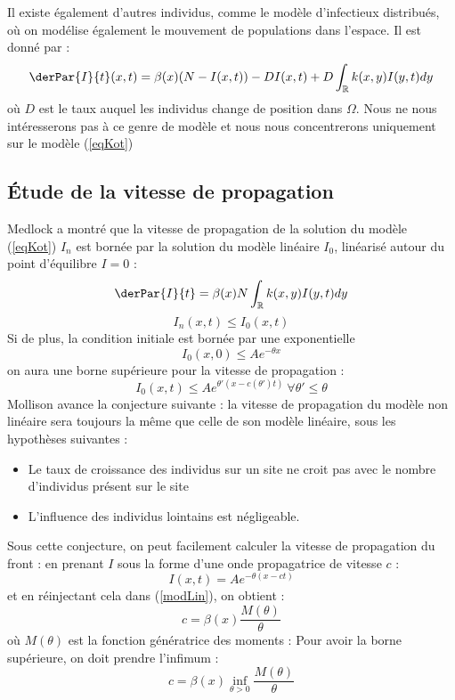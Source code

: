 \documentclass{article}
\begin{document}
\bigskip
Il existe également d'autres individus, comme le modèle d'infectieux distribués, où on modélise également le mouvement de populations dans l'espace. Il est donné par :
\begin{equation}
	\derPar{I}{t}(x,t)=\beta(x)(N-I(x,t))-DI(x,t)+D\int_{\mathbb{R}}k(x,y)I(y,t) dy
\end{equation}
où $D$ est le taux auquel les individus change de position dans $\Omega$. Nous ne nous intéresserons pas à ce genre de modèle et nous nous concentrerons uniquement sur le modèle (\ref{eqKot})

\subsection{Étude de la vitesse de propagation}
\label{refVit}
Medlock \cite{KotMedlock03} a montré que la vitesse de propagation de la solution du modèle (\ref{eqKot}) $I_n$ est bornée par la solution du modèle linéaire $I_0$, linéarisé autour du point d'équilibre $I=0$ :
\begin{equation}\label{modLin}
\derPar{I}{t}=\beta(x)N\int_{\mathbb{R}}k(x,y)I(y,t) dy
\end{equation}
\[I_n(x,t)\leq I_0(x,t)\]
Si de plus, la condition initiale est bornée par une exponentielle \[I_0(x,0)\leq Ae^{-\theta x}\] on aura une borne supérieure pour la vitesse de propagation :
\begin{equation}\label{bornSup}
	I_0(x,t)\leq Ae^{\theta'(x-c(\theta')t)}\ \forall \theta'\leq \theta
\end{equation}
Mollison \cite{mollison1991dependence} avance la conjecture suivante : la vitesse de propagation du modèle non linéaire sera toujours la même que celle de son modèle linéaire, sous les hypothèses suivantes :
\begin{itemize}
	\item Le taux de croissance des individus sur un site ne croit pas avec le nombre d'individus présent sur le site
	\item L'influence des individus lointains est négligeable.
\end{itemize}
Sous cette conjecture, on peut facilement calculer la vitesse de propagation du front : en prenant $I$ sous la forme d'une onde propagatrice de vitesse $c$ :
	\[I(x,t)=Ae^{-\theta(x-ct)}\]
et en réinjectant cela dans (\ref{modLin}), on obtient :
	\[c=\beta(x)\frac{M(\theta)}{\theta}\]
où $M(\theta)$ est la fonction génératrice des moments :
Pour avoir la borne supérieure, on doit prendre l'infimum :
\begin{equation}\label{bornVit}
	c=\beta(x)\inf_{\theta>0}\frac{M(\theta)}{\theta}
\end{equation}
\end{document}
